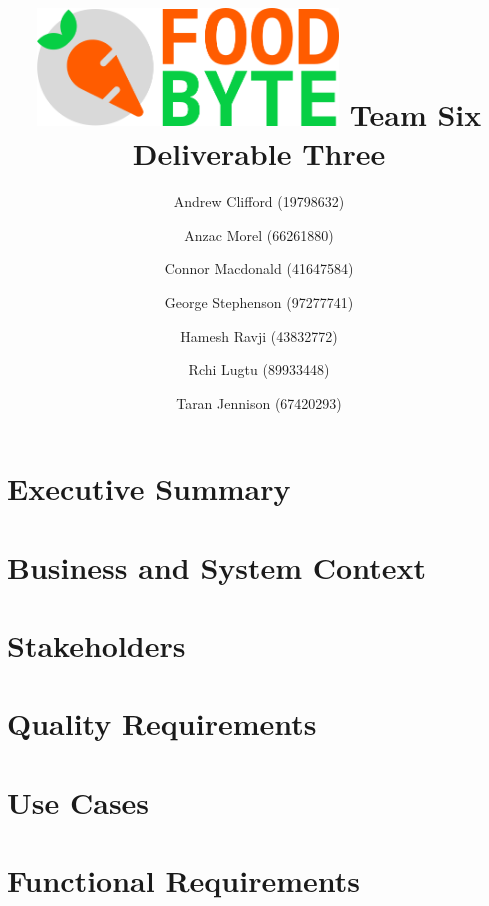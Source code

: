 \documentclass{article}
\begin{document}
	\title{\includegraphics[width=8cm]{images/logo_main.png}\linebreak
		   Team Six Deliverable Three}
	\author{Andrew Clifford (19798632)
		    \and Anzac Morel (66261880)
	    	\and Connor Macdonald (41647584)
    		\and George Stephenson (97277741)
    		\and Hamesh Ravji (43832772)
    		\and Rchi Lugtu (89933448)
    		\and Taran Jennison (67420293)}
	\maketitle
	\pagebreak
	\tableofcontents
	\pagebreak
	
	\section{Executive Summary} 
	
	\section{Business and System Context}
	
	
	\section{Stakeholders}
	
	
	\section{Quality Requirements}
	
	
	\section{Use Cases}
	
	
	\section{Functional Requirements}
	
	
\end{document}
